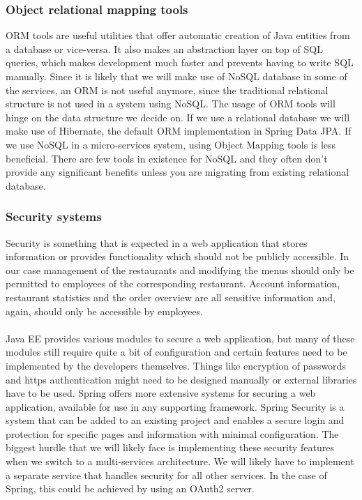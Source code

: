 \documentclass[12pt]{article}
\begin{document}
\begin{multicols}{2}
\subsubsection{Object relational mapping tools}
ORM tools are useful utilities that offer automatic creation of Java entities from a database or vice-versa. It also makes an abstraction layer on top of SQL queries, which makes development much faster and prevents having to write SQL manually. Since it is likely that we will make use of NoSQL database in some of the services, an ORM is not useful anymore, since the traditional relational structure is not used in a system using NoSQL. The usage of ORM tools will hinge on the data structure we decide on. If we use a relational database we will make use of Hibernate, the default ORM implementation in Spring Data JPA. If we use NoSQL in a micro-services system, using Object Mapping tools is less beneficial. There are few tools in existence for NoSQL and they often don't provide any significant benefits unless you are migrating from existing relational database. \cite{ormNosql85:online}
\subsubsection{Security systems}
Security is something that is expected in a web application that stores information or provides functionality which should not be publicly accessible. In our case management of the restaurants and modifying the menus should only be permitted to employees of the corresponding restaurant. Account information, restaurant statistics and the order overview are all sensitive information and, again, should only be accessible by employees.
\\\\
Java EE provides various modules to secure a web application, but many of these modules still require quite a bit of configuration and certain features need to be implemented by the developers themselves. \cite{JavaEESecurity29:online} Things like encryption of passwords and https authentication might need to be designed  manually or external libraries have to be used. Spring offers more extensive systems for securing a web application, available for use in any supporting framework. Spring Security is a system that can be added to an existing project and enables a secure login and protection for specific pages and information with minimal configuration. The biggest hurdle that we will likely face is implementing these security features when we switch to a multi-services architecture. We will likely have to implement a separate service that handles security for all other services. In the case of Spring, this could be achieved by using an OAuth2 server.
\cite{SpringCloudSecurity52:online}

\end{multicols}
\end{document}
